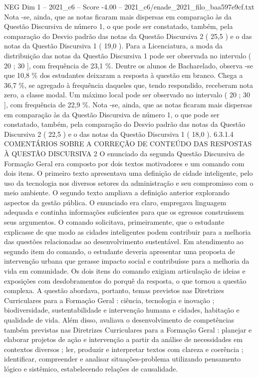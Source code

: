 \begin{textsample}{NEG Dim 1 – 2021\_c6 – Score -4.00 – 2021\_c6/enade\_2021\_filo\_baa597e9cf.txt}
Nota -se, ainda, que as notas ficaram mais dispersas em comparação às da Questão Discursiva de número 1, o que pode ser constatado, também, pela comparação do Desvio padrão das notas da Questão Discursiva 2 ( 25,5 ) e o das notas da Questão Discursiva 1 ( 19,0 ).
Para a Licenciatura, a moda da distribuição das notas da Questão Discursiva 1 pode ser observada no intervalo ( 20 ; 30 ], com frequência de 23,1 \%.
Dentre os alunos de Bacharelado, observa -se que 10,8 \% dos estudantes deixaram a resposta à questão em branco.
Chega a 36,7 \%, se agregado à frequência daqueles que, tendo respondido, receberam nota zero, a classe modal.
Um máximo local pode ser observado no intervalo ( 20 ; 30 ], com frequência de 22,9 \%.
Nota -se, ainda, que as notas ficaram mais dispersas em comparação às da Questão Discursiva de número 1, o que pode ser constatado, também, pela comparação do Desvio padrão das notas da Questão Discursiva 2 ( 22,5 ) e o das notas da Questão Discursiva 1 ( 18,0 ). 6.3.1.4 COMENTÁRIOS SOBRE A CORREÇÃO DE CONTEÚDO DAS RESPOSTAS À QUESTÃO DISCURSIVA 2 O enunciado da segunda Questão Discursiva de Formação Geral era composto por dois textos motivadores e um comando com dois itens.
O primeiro texto apresentava uma definição de cidade inteligente, pelo uso da tecnologia nos diversos setores da administração e seu compromisso com o meio ambiente.
O segundo texto ampliava a definição anterior explorando aspectos da gestão pública.
O enunciado era claro, empregava linguagem adequada e continha informações suficientes para que os egressos construíssem seus argumentos.
O comando solicitava, primeiramente, que o estudante explicasse de que modo as cidades inteligentes podem contribuir para a melhoria das questões relacionadas ao desenvolvimento sustentável.
Em atendimento ao segundo item do comando, o estudante deveria apresentar uma proposta de intervenção urbana que gerasse impacto social e contribuísse para a melhoria da vida em comunidade.
Os dois itens do comando exigiam articulação de ideias e exposições com desdobramentos do porquê da resposta, o que tornou a questão complexa.
A questão abordava, portanto, temas previstos nas Diretrizes Curriculares para a Formação Geral : ciência, tecnologia e inovação ; biodiversidade, sustentabilidade e intervenção humana e cidades, habitação e qualidade de vida.
Além disso, avaliava o desenvolvimento de competências também previstas nas Diretrizes Curriculares para a Formação Geral : planejar e elaborar projetos de ação e intervenção a partir da análise de necessidades em contextos diversos ; ler, produzir e interpretar textos com clareza e coerência ; identificar, compreender e analisar situações-problema utilizando pensamento lógico e sistêmico, estabelecendo relações de causalidade.

\end{textsample}
